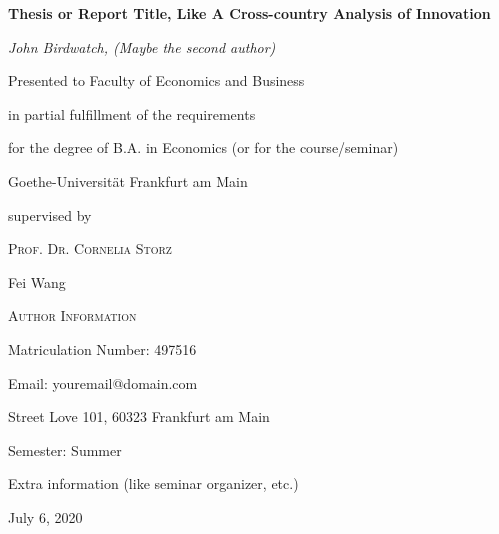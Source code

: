 \documentclass[12pt, a4paper]{article}
\begin{document}
\begin{titlepage}
    \par\vspace{1.5cm}
    \centering
	{\LARGE\bfseries Thesis or Report Title, Like A Cross-country Analysis of Innovation \par}
	\vspace{0.7cm}
	{\Large\itshape John Birdwatch, (Maybe the second author)\par} 
    \vspace{0.7cm}
    {Presented to Faculty of Economics and Business \par}
    {in partial fulfillment of the requirements\par}
    {for the degree of B.A. in Economics (or for the course/seminar)\par}
    \vspace{0.3cm}
    {\large Goethe-Universität Frankfurt am Main \par}
    \vspace{2cm}
	supervised by\par
    \textsc{Prof. Dr. Cornelia Storz} \par
    Fei Wang \par 
    \vspace{3cm}
    \begin{flushleft}  %
    \scshape\small Author Information \par
    Matriculation Number: 497516 \par 
    Email: youremail@domain.com \par 
    Street Love 101, 60323 Frankfurt am Main \par
    Semester: Summer \par 
    Extra information (like seminar organizer, etc.)
    \end{flushleft}

	\vfill   %

	{\large July 6, 2020\par}  
\end{titlepage}
\end{document}
